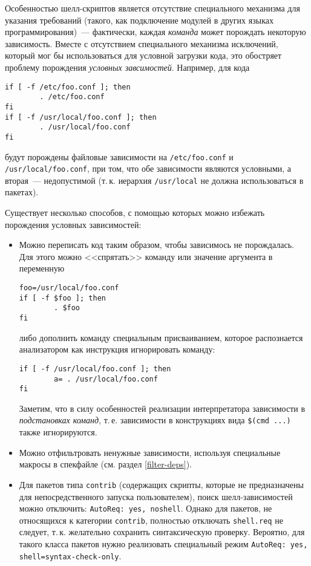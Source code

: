 \documentclass[russian,a4paper,12pt,titlepage]{article}
\begin{document}
Особенностью шелл-скриптов является отсутствие специального механизма для указания требований (такого, как подключение
модулей в других языках программирования)~--- фактически, каждая \textit{команда} может порождать некоторую зависимость.
Вместе с отсутствием специального механизма исключений, который мог бы использоваться для условной загрузки кода,
это обостряет проблему порождения \textit{условных завсимостей}.  Например, для кода
\begin{verbatim}
if [ -f /etc/foo.conf ]; then
        . /etc/foo.conf
fi
if [ -f /usr/local/foo.conf ]; then
        . /usr/local/foo.conf
fi
\end{verbatim}
будут порождены файловые зависимости на \verb|/etc/foo.conf| и \verb|/usr/local/foo.conf|, при том,
что обе зависимости являются условными, а вторая~--- недопустимой (т.\,к. иерархия \verb|/usr/local|
не должна использоваться в пакетах).

Существует несколько способов, с помощью которых можно избежать порождения условных зависимостей:
\begin{itemize}
\item Можно переписать код таким образом, чтобы зависимось не порождалась.
Для этого можно <<спрятать>> команду или значение аргумента в переменную
\begin{verbatim}
foo=/usr/local/foo.conf
if [ -f $foo ]; then
        . $foo
fi
\end{verbatim}
либо дополнить команду специальным присваиванием, которое распознается анализатором
как инструкция игнорировать команду:
\begin{verbatim}
if [ -f /usr/local/foo.conf ]; then
        a= . /usr/local/foo.conf
fi
\end{verbatim}
Заметим, что в силу особенностей реализации интерпретатора зависимости в \textit{подстановках команд},
т.\,е. зависимости в конструкциях вида \verb|$(cmd ...)| также игнорируются.
\item Можно отфильтровать ненужные зависимости, используя специальные макросы в спекфайле
(см. раздел \ref{filter-deps}).
\item Для пакетов типа \verb|contrib| (содержащих скрипты, которые не предназначены для
непосредственного запуска пользователем), поиск шелл-зависимостей можно отключить:
\texttt{AutoReq: yes, noshell}.  Однако для пакетов, не относящихся к категории \verb|contrib|,
полностью отключать \verb|shell.req| не следует, т.\,к. желательно сохранить синтаксическую
проверку.  Вероятно, для такого класса пакетов нужно реализовать специальный режим
\texttt{AutoReq: yes, shell=syntax-check-only}.
\end{itemize}
\end{document}
